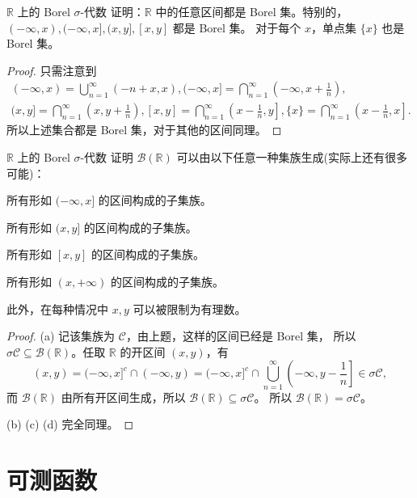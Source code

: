 \documentclass[fontset=none]{Notes}
\begin{document}
\begin{exercise}{$\mathbb{R}$ 上的 Borel $\sigma$-代数}{}
  证明：$\mathbb{R}$ 中的任意区间都是 Borel 集。特别的，$(-\infty,x),(-\infty,x],(x,y],[x,y]$ 都是 Borel 集。
  对于每个 $x$，单点集 $\{x\}$ 也是 Borel 集。 
\end{exercise}
\begin{proof}
  只需注意到
  \begin{gather*}
    (-\infty,x)=\bigcup_{n=1}^\infty \left(-n+x,x\right), 
    (-\infty, x]=\bigcap_{n=1}^\infty \left(-\infty,x+\frac{1}{n}\right),\\
    (x,y]=\bigcap_{n=1}^\infty \left(x,y+\frac{1}{n}\right),
    [x,y]=\bigcap_{n=1}^\infty\left(x-\frac{1}{n},y\right],
    \{x\}=\bigcap_{n=1}^\infty\left(x-\frac{1}{n},x\right].
  \end{gather*}
  所以上述集合都是 Borel 集，对于其他的区间同理。
\end{proof}

\begin{exercise}{$\mathbb{R}$ 上的 Borel $\sigma$-代数}{}
  证明 $\mathcal{B}(\mathbb{R})$ 可以由以下任意一种集族生成(实际上还有很多可能)：
  \begin{alphenum}[nosep]
    \item 所有形如 $(-\infty, x]$ 的区间构成的子集族。
    \item 所有形如 $(x,y]$ 的区间构成的子集族。
    \item 所有形如 $[x,y]$ 的区间构成的子集族。
    \item 所有形如 $(x,+\infty)$ 的区间构成的子集族。
  \end{alphenum}
  此外，在每种情况中 $x,y$ 可以被限制为有理数。
\end{exercise}
\begin{proof}
  (a) 记该集族为 $\mathcal{C}$，由上题，这样的区间已经是 Borel 集，
  所以 $\sigma\mathcal{C}\subseteq \mathcal{B}(\mathbb{R})$。任取 $\mathbb{R}$
  的开区间 $(x,y)$，有
  \[
    (x,y)=(-\infty,x]^c\cap (-\infty, y)=
    (-\infty,x]^c\cap\bigcup_{n=1}^\infty \left(-\infty,y-\frac{1}{n}\right]\in\sigma \mathcal{C},
  \]
  而 $\mathcal{B}(\mathbb{R})$ 由所有开区间生成，所以 $\mathcal{B}(\mathbb{R})\subseteq \sigma \mathcal{C}$。
  所以 $\mathcal{B}(\mathbb{R})=\sigma \mathcal{C}$。

  (b) (c) (d) 完全同理。
\end{proof}



\section{可测函数}
\end{document}
